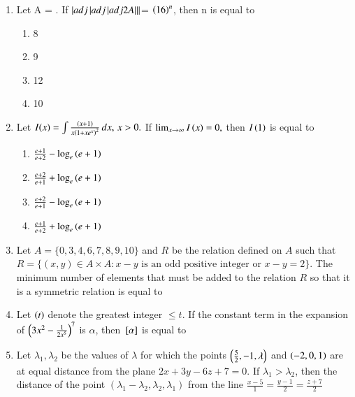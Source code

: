 \documentclass[journal]{IEEEtran}
\numberwithin{equation}{enumi}
\numberwithin{figure}{enumi}
\begin{document}
\begin{enumerate}[start=16]
\begin{multicols}{4}
\begin{enumerate}
    \item 18
    \end{enumerate}
\end{multicols}
\item Let A =   . If  $\left\vert adj\left\vert adj\left\vert adj2A\right\vert\right\vert\right\vert$= $\left(16\right)^n$, then n is equal to
\begin{multicols}{4}
    \begin{enumerate}
    \item 8
    \item 9
    \item 12
    \item 10
    \end{enumerate}
\end{multicols}
\item Let \( I(x) = \int \frac{\left(x+1\right)}{x\left(1 + x e^x\right)^2} \, dx, \, x > 0. \) If \( \lim_{x \to \infty} I\left(x\right) = 0, \) then \( I\left(1\right) \) is equal to
\begin{multicols}{2}
    \begin{enumerate}
    \item  $\frac{e+1}{e+2} - \log_e\left(e+1\right) $
    \item  $\frac{e+2}{e+1} + \log_e\left(e+1\right)$ 
    \item  $\frac{e+2}{e+1} - \log_e\left(e+1\right) $
    \item  $\frac{e+1}{e+2} + \log_e\left(e+1\right) $
\end{enumerate}
\end{multicols}
\item   Let $A = \{0, 3, 4, 6, 7, 8, 9, 10\}$ and $R$ be the relation defined on $A$ such that $R = \{(x, y) \in A \times A : x - y \text{ is an odd positive integer or } x - y = 2 \}$. The minimum number of elements that must be added to the relation $R$ so that it is a symmetric relation is equal to 
\item Let $\left(t\right)$ denote the greatest integer $\leq t$. If the constant term in the expansion of $\left(3x^2 - \frac{1}{2x^5}\right)^7$ is $\alpha$, then ${}\left[\alpha\right]$  is equal to 
\item Let $\lambda_1, \lambda_2$ be the values of $\lambda$ for which the points 
$\left(\frac{5}{2}, -1, \lambda\right)$ and $\left(-2, 0, 1\right)$ 
are at equal distance from the plane $2x + 3y - 6z + 7 = 0$. 
If $\lambda_1 > \lambda_2$, then the distance of the point $(\lambda_1 - \lambda_2, \lambda_2, \lambda_1)$ 
from the line $\frac{x - 5}{1} = \frac{y - 1}{2} = \frac{z + 7}{2}$

\end{enumerate}
\end{document}
